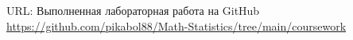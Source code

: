 \documentclass[../body.tex]{subfiles}
\begin{document}
URL: Выполненная лабораторная работа на GitHub \\ \url{https://github.com/pikabol88/Math-Statistics/tree/main/coursework}
\end{document}
